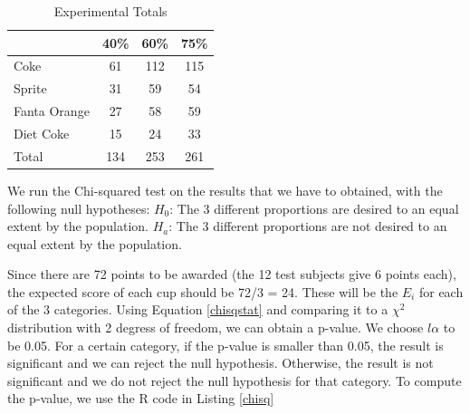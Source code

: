 \documentclass[oneside,12pt]{report}
\begin{document}
\begin{table}[ h] 
\centering
\begin{tabular}{ l || c|c|c }
  &40\% &60\% & 75\%  \\
\hline  
Coke & 61 & 112 & 115 \\
\hline  
Sprite & 31& 59 & 54 \\
\hline  
Fanta Orange & 27 & 58 & 59 \\ 
\hline  
Diet Coke & 15 & 24& 33 \\ 
\hline  
Total & 134 & 253 & 261  \\ 
\hline     
 \end{tabular}
\caption{Experimental Totals}
\label{ExpTotal}
\end{table}

\newpage

\noindent We run the Chi-squared test on the results that we have to obtained, with the following null hypotheses:
\vskip6pt $H_0$: The 3 different proportions are desired to an equal extent by the population.
\vskip3pt $H_a$: The 3 different proportions are not desired to an equal extent by the population.
\vskip6pt
\vspace{12pt}

\noindent Since there are 72 points to be awarded (the 12 test subjects give 6 points each), the expected score of each cup should be 72/3 = 24. These will be the $E_i$ for each of the 3 categories. Using Equation \eqref{chisqstat} and comparing it to a $\chi^2$ distribution with 2 degress of freedom, we can obtain a p-value. We choose $l\alpha$ to be 0.05. For a certain category, if the p-value is smaller than 0.05, the result is significant and we can reject the null hypothesis. Otherwise, the result is not significant and we do not reject the null hypothesis for that category. To compute the p-value, we use the R code in Listing \ref{chisq}
\end{document}

